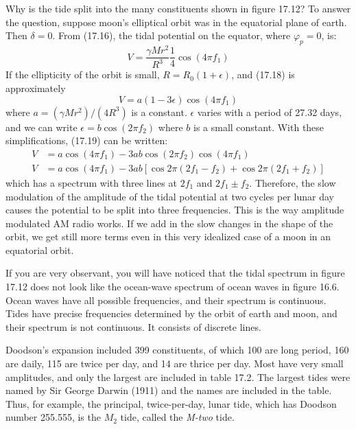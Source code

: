 Why is the tide split into the many constituents shown in figure
17.12? To answer the question, suppose moon's elliptical orbit was in
the equatorial plane of earth. Then $\delta = 0$. From (17.16), the
tidal potential on the equator, where $\varphi_p =0$, is:
\begin{equation}
V = \frac{\gamma M r^{2}}{R^{3}} \frac{1}{4} \cos \left(4 \pi f_1 \right)
\end{equation}
If the ellipticity of the orbit is small, $R= R_0 (1+\epsilon )$, and
(17.18) is approximately
\begin{equation}
V = a (1-3\epsilon) \cos \left(4 \pi f_1 \right)
\end{equation}
where $a=\left( \gamma M r^2 \right)/\left( 4 R^3 \right)$ is a
constant.  $\epsilon$ varies with a period of 27.32 days, and we can
write $\epsilon = b \cos (2 \pi f_2)$ where $b$ is a small
constant. With these simplifications, (17.19) can be written:
\begin{subequations}
\begin{align}
V &= a \cos \left(4 \pi f_1 \right) -3 a b \cos \left( 2 \pi f_2 \right) \cos \left(4 \pi f_1 \right) \\
V &= a \cos \left(4\pi f_1 \right) - 3 a b \left[ \cos 2\pi \left( 2f_1 - f_2 \right) + \cos 2\pi \left( 2f_1 + f_2 \right) \right]
\end{align}
\end{subequations}
which has a spectrum with three lines at $2 f_1$ and $ 2 f_1 \pm
f_2$. Therefore, the slow modulation of the amplitude of the tidal
potential at two cycles per lunar day causes the potential to be split
into three frequencies. This is the way amplitude modulated AM radio
works. If we add in the slow changes in the shape of the orbit, we get
still more terms even in this very idealized case of a
moon in an equatorial orbit.

If you are very observant, you will have noticed that the tidal
spectrum in figure 17.12 does not look like the ocean-wave spectrum of
ocean waves in figure 16.6. Ocean waves have all possible frequencies,
and their spectrum is continuous. Tides have precise frequencies
determined by the orbit of earth and moon, and their
spectrum is not continuous. It consists of discrete lines.

Doodson's expansion included 399 constituents, of which 100 are long
period, 160 are daily, 115 are twice per day, and 14 are thrice per
day. Most have very small amplitudes, and only the largest are
included in table 17.2. The largest tides were named by Sir George
Darwin (1911) and the names are included in the table.  Thus, for
example, the principal, twice-per-day, lunar tide, which has Doodson
number 255.555, is the $M_2$ tide, called the \textit{M-two} tide.
 



